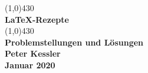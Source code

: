 \begin{center}
  \vspace*{5.5cm}
  \line(1,0){430}\\
  [5mm]
  \Huge \textbf{\LaTeX-Rezepte} \\
  [3mm]
  \line(1,0){430}\\
  \vspace{1.5cm}
  \LARGE\textbf{Problemstellungen und Lösungen}\\
  \vspace{1.5cm}
  \Large\textbf{Peter Kessler}\\  
  \Large\textbf{Januar 2020}\\  
  \vfill
\end{center}
